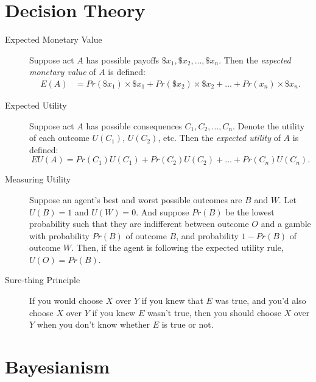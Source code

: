 \documentclass[justified]{tufte-book}
\renewcommand{\u}{U}
\newcommand{\p}{Pr}
\newcommand{\E}{E}
\newcommand{\EU}{EU}
\theoremstyle{definition}
\theoremstyle{definition}
\theoremstyle{definition}
\theoremstyle{remark}
\begin{document}
\hypertarget{decision-theory}{%
\section*{Decision Theory}\label{decision-theory}}

\begin{description}
\item[Expected Monetary Value]
Suppose act \(A\) has possible payoffs \(\$x_1, \$x_2, \ldots, \$x_n\). Then the \emph{expected monetary value} of \(A\) is defined:
\[
  \begin{aligned}
\E(A) &= \p(\$x_1) \times \$x_1 + \p(\$x_2) \times \$x_2 + \ldots + \p(x_n) \times \$x_n.
  \end{aligned}
\]
\item[Expected Utility]
Suppose act \(A\) has possible consequences \(C_1, C_2, \ldots,C_n\). Denote the utility of each outcome \(U(C_1)\), \(U(C_2)\), etc. Then the \emph{expected utility} of \(A\) is defined:
\[ \EU(A) = \p(C_1)\u(C_1) + \p(C_2)\u(C_2) + \ldots + \p(C_n)\u(C_n). \]
\item[Measuring Utility]
Suppose an agent's best and worst possible outcomes are \(B\) and \(W\). Let \(\u(B) = 1\) and \(\u(W) = 0\). And suppose \(\p(B)\) be the lowest probability such that they are indifferent between outcome \(O\) and a gamble with probability \(\p(B)\) of outcome \(B\), and probability \(1 - \p(B)\) of outcome \(W\). Then, if the agent is following the expected utility rule, \(\u(O) = \p(B)\).
\item[Sure-thing Principle]
If you would choose \(X\) over \(Y\) if you knew that \(E\) was true, and you'd also choose \(X\) over \(Y\) if you knew \(E\) wasn't true, then you should choose \(X\) over \(Y\) when you don't know whether \(E\) is true or not.
\end{description}

\hypertarget{bayesianism-1}{%
\section*{Bayesianism}\label{bayesianism-1}}
\end{document}
